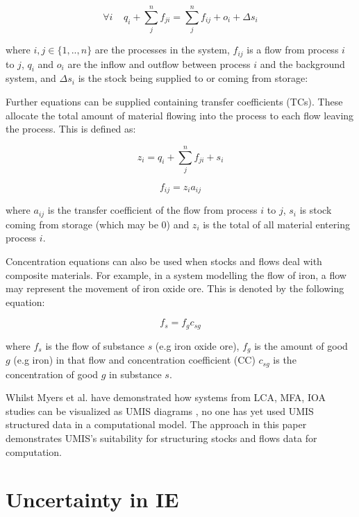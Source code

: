\documentclass[ %
                    author={Tom Jager},
                supervisor={Dr. Daniel Schien},
                    degree={MEng},
                     title={A Bayesian Inference Engine for Calibrating Uncertainty over UMIS Structured MFA Systems},
                  subtitle={},
                      type={research},
                      year={2019} ]{dissertation}
\begin{document}
\begin{equation}
    \label{eq:mass_balance_1}
    \forall i \; \; \; \;  q_i + \sum^{n}_{j}f_{ji} = \sum^{n}_{j}f_{ij} + o_{i} + \Delta s_i 
\end{equation}

where $i,j \in \{1,..,n\} $ are the processes in the system, $f_{ij}$ is a flow from process $i$ to $j$, $q_i$ and $o_i$ are the inflow and outflow between process $i$ and the background system, and $\Delta s_i$ is the stock being supplied to or coming from storage:     


Further equations can be supplied containing transfer coefficients (TCs). These allocate the total amount of material flowing into the process to each flow leaving the process. This is defined as:

\begin{equation}
    \label{eq:mass_balance_2}
    z_i = q_i + \sum^{n}_{j}f_{ji} + s_i
\end{equation}

\begin{equation}
    \label{eq:mass_balance_3}
    f_{ij} = z_{i}a_{ij}
\end{equation}

where $a_{ij}$ is the transfer coefficient of the flow from process $i$ to $j$, $s_i$ is stock coming from storage (which may be 0) and $z_i$ is the total of all material entering process $i$.

Concentration equations can also be used when stocks and flows deal with composite materials. For example, in a system modelling the flow of iron, a flow may represent the movement of iron oxide ore. This is denoted by the following equation:

\begin{equation}
    \label{eq:mass_balance_4}
    f_s = f_g c_{sg}
\end{equation}

where $f_s$ is the flow of substance $s$ (e.g iron oxide ore), $f_g$ is the amount of good $g$ (e.g iron) in that flow and concentration coefficient (CC) $c_{sg}$ is the concentration of good $g$ in substance $s$.

Whilst Myers et al. have demonstrated how systems from LCA, MFA, IOA studies can be visualized as UMIS diagrams \cite{myers2019unified}, no one has yet used UMIS structured data in a computational model. The approach in this paper demonstrates UMIS's suitability for structuring stocks and flows data for computation.

\section{Uncertainty in IE}
\end{document}
